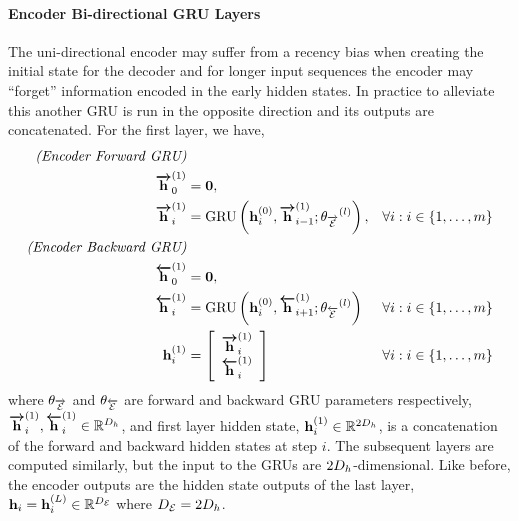 \paragraph{{Encoder Bi-directional GRU Layers}}
The uni-directional encoder may suffer from a recency bias when creating the initial state for the 
decoder and for longer input sequences the encoder may ``forget'' information encoded in the 
early hidden states. In practice to alleviate this another GRU is run in the opposite direction and
its outputs are concatenated. For the first layer, we have,
\begin{align*}
    \textit{(Encoder Forward GRU)}\\
    {\boldsymbol{\overrightarrow{\mathbf{h}}}}_0^{(1)} & = \mathbf{0},\\ 
    {\boldsymbol{\overrightarrow{\mathbf{h}}}}_i^{(1)} & =\operatorname{GRU}\left(\mathbf{h}_i^{(0)}, {\boldsymbol{\overrightarrow{\mathbf{h}}}}_{i-1}^{(1)}; {\theta_{\overrightarrow{\mathcal{E}}}}^{(l)}\right), & \forall i : i \in \{1,\ldots, m\}\\
    \textit{(Encoder Backward GRU)}\\
     {\boldsymbol{\overleftarrow{\mathbf{h}}}}_0^{(1)} &= \mathbf{0}, \\
    {\boldsymbol{\overleftarrow{\mathbf{h}}}}_i^{(1)} & =\operatorname{GRU}\left(\mathbf{h}_i^{(0)}, {\boldsymbol{\overleftarrow{\mathbf{h}}}}_{i+1}^{(1)}; {\theta_{\overleftarrow{\mathcal{E}}}}^{(l)}\right)    & \forall i : i \in \{1,\ldots, m\}\\
  \mathbf{h}^{(1)}_i & = \left[\begin{array}{c} {\boldsymbol{\overrightarrow{\mathbf{h}}}}_i^{(1)} \\ {\boldsymbol{\overleftarrow{\mathbf{h}}}}_i^{(1)} \end{array}\right]
& \forall i : i \in \{1,\ldots, m\}\\
\end{align*}
where ${\theta_{\overrightarrow{\mathcal{E}}}}$ and ${\theta_{\overleftarrow{\mathcal{E}}}}$ are forward and backward GRU parameters respectively,
${\boldsymbol{\overrightarrow{\mathbf{h}}}}^{(1)}_i,{\boldsymbol{\overleftarrow{\mathbf{h}}}}^{(1)}_i\in\mathbb{R}^{D_{h}}$, and first layer hidden state,
$\mathbf{h}^{(1)}_i\in\mathbb{R}^{2D_{h}}$, is a concatenation of the forward and backward hidden
states at step $i$. 
The subsequent layers are computed similarly, but the input to the GRUs are $2D_{h}$-dimensional.
Like before, the encoder outputs are the hidden state outputs of the last layer, $\mathbf{h}_i = \mathbf{h}_i^{(L)} \in \mathbb{R}^{{D_\mathcal{E}}}$ where ${D_\mathcal{E}} = 2D_{h}$.


